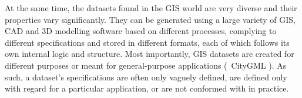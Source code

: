 At the same time, the datasets found in the GIS world are very diverse and their properties vary significantly.
They can be generated using a large variety of GIS, CAD and 3D modelling software based on different processes, complying to different specifications and stored in different formats, each of which follows its own internal logic and structure.
Most importantly, GIS datasets are created for different purposes or meant for general-purpose applications (\eg\ CityGML \citep{CityGML2}).
As such, a dataset's specifications are often only vaguely defined, are defined only with regard for a particular application, or are not conformed with in practice.


